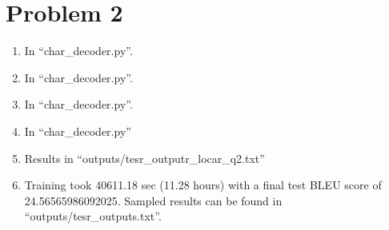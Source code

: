 \documentclass[12pt]{article}
\begin{document}
\section*{Problem 2}
\begin{enumerate}[label=(\alph*)]
  \item In ``char\_decoder.py''.
  \item In ``char\_decoder.py''.
  \item In ``char\_decoder.py''.
  \item In ``char\_decoder.py''
  \item Results in ``outputs/tesr\_outputr\_locar\_q2.txt''
  \item Training took 40611.18 sec (11.28 hours) with a final test BLEU score of 24.56565986092025. Sampled results can be found in ``outputs/tesr\_outputs.txt''.
\end{enumerate}
\end{document}
